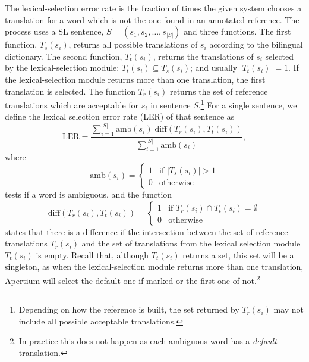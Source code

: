 \documentclass[11pt]{article}
\newcommand{\todomlf}[1]{\renewcommand{\baselinestretch}{0.55}\todo{\scriptsize\sf MLF: #1}\renewcommand{\baselinestretch}{1.0}}
\newcommand{\comment}[1]{\todo{#1}}
\begin{document}
The lexical-selection error rate is the fraction of times the given
system chooses a translation for a word which is not  the one found in an
annotated reference. The process uses a SL sentence, $S =
(s_1, s_2, \ldots, s_{|S|})$ and three functions. The first function,
$T_s(s_i)$, returns all possible translations of $s_i$ according to
the bilingual dictionary. The second function, $T_t(s_i)$, returns the
translations of $s_i$ selected by the lexical-selection module:
$T_t(s_i) \subseteq T_s(s_i)$; and usually $|T_t(s_i)| = 1$. If the
lexical-selection module returns more than one translation, the first
translation is selected. 
The
function $T_r(s_i)$ returns the set of reference translations which
are acceptable for $s_i$ in sentence $S$.\footnote{Depending on how
  the reference is built, the set returned by $T_r(s_i)$ %
  may not include all possible
  acceptable translations.} For a
single sentence, we define the lexical selection error rate (LER) of
that sentence as%
\begin{equation}
\mathrm{LER} = \frac{\sum_{i=1}^{|S|} \mathrm{amb}(s_i)\; \mathrm{diff}(T_r(s_i), T_t(s_i))}{\sum_{i=1}^{|S|} \mathrm{amb}(s_i)},
\label{eq:ler}
\end{equation}
where
\begin{equation}
\mathrm{amb}(s_i) = \left \{ \begin{matrix}
                 1 & \mbox{if } |T_s(s_i)| > 1   \\
                 0 & \mbox{otherwise} \end{matrix} \right.
\label{eq:amb}
\end{equation}
 tests if a word is ambiguous, and the  function 
\begin{equation}
\mathrm{diff}(T_r(s_i), T_t(s_i)) = \left \{ \begin{matrix}
                 1 & \mbox{if } T_r(s_i) \cap T_t(s_i) = \emptyset   \\
                 0 & \mbox{otherwise} \end{matrix} \right.
\label{eq:diff}
\end{equation}
states that there is a difference if the intersection between the set
of reference translations $T_r(s_i)$ and the set of translations from
the lexical selection module $T_t(s_i)$ is empty.  Recall
that, %
although $T_t(s_i)$ returns a set,
this set will be a singleton, as when the lexical-selection module
returns more than one translation, Apertium will select the default one if marked or the first one of not.\footnote{In practice this does not happen as each ambiguous
  word has a \emph{default} translation.}%
\end{document}

